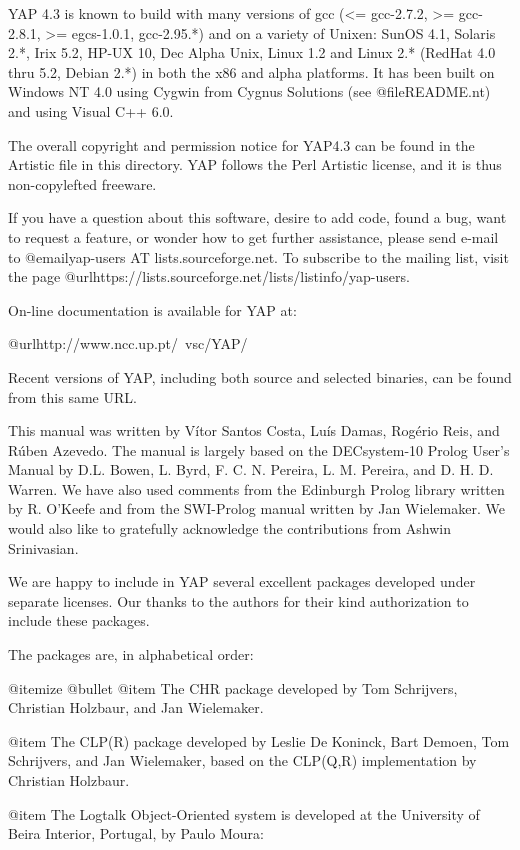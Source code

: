 YAP 4.3 is known to build with many versions of gcc (<= gcc-2.7.2, >=
gcc-2.8.1, >= egcs-1.0.1, gcc-2.95.*) and on a variety of Unixen:
SunOS 4.1, Solaris 2.*, Irix 5.2, HP-UX 10, Dec Alpha Unix, Linux 1.2
and Linux 2.* (RedHat 4.0 thru 5.2, Debian 2.*) in both the x86 and
alpha platforms. It has been built on Windows NT 4.0 using Cygwin from
Cygnus Solutions (see @file{README.nt}) and using Visual C++ 6.0.

The overall copyright and permission notice for YAP4.3 can be found in
the Artistic file in this directory. YAP follows the Perl Artistic
license, and it is thus non-copylefted freeware.

If you have a question about this software, desire to add code, found a
bug, want to request a feature, or wonder how to get further assistance,
please send e-mail to @email{yap-users AT lists.sourceforge.net}.  To
subscribe to the mailing list, visit the page
@url{https://lists.sourceforge.net/lists/listinfo/yap-users}.

On-line documentation is available for YAP at:

        @url{http://www.ncc.up.pt/~vsc/YAP/}

Recent versions of YAP, including both source and selected binaries,
can be found from this same URL.

This manual was written by Vítor Santos Costa,
Luís Damas, Rogério Reis, and Rúben Azevedo. The
manual is largely based on the DECsystem-10 Prolog User's Manual by
D.L. Bowen, L. Byrd, F. C. N. Pereira, L. M. Pereira, and
D. H. D. Warren. We have also used comments from the Edinburgh Prolog
library written by R. O'Keefe and from the SWI-Prolog manual written by
Jan Wielemaker. We would also like to gratefully
acknowledge the contributions from Ashwin Srinivasian.

We are happy to include in YAP several excellent packages developed
under separate licenses. Our thanks to the authors for their kind
authorization to include these packages.

The packages are, in alphabetical order:

@itemize @bullet
@item The CHR package developed by Tom Schrijvers,
Christian Holzbaur, and Jan Wielemaker.

@item The CLP(R) package developed by Leslie De Koninck, Bart Demoen, Tom
Schrijvers, and Jan Wielemaker, based on the CLP(Q,R) implementation
by Christian Holzbaur.

@item The Logtalk Object-Oriented system is developed at the University 
of Beira Interior, Portugal, by Paulo Moura:

